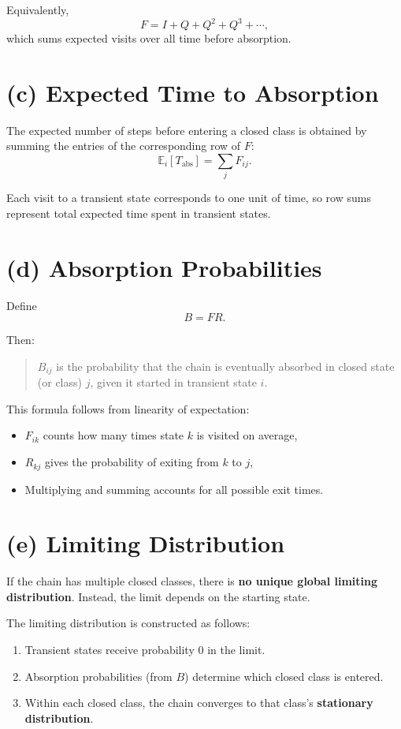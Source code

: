 \documentclass[11pt]{article}
\begin{document}
Equivalently,
\[
F = I + Q + Q^2 + Q^3 + \cdots,
\]
which sums expected visits over all time before absorption.

\section*{(c) Expected Time to Absorption}

The expected number of steps before entering a closed class is obtained by summing the entries of the corresponding row of $F$:
\[
\mathbb{E}_i[T_{\text{abs}}] = \sum_j F_{ij}.
\]

Each visit to a transient state corresponds to one unit of time, so row sums represent total expected time spent in transient states.

\section*{(d) Absorption Probabilities}

Define
\[
B = FR.
\]

Then:
\begin{quote}
$B_{ij}$ is the probability that the chain is eventually absorbed in closed state (or class) $j$, given it started in transient state $i$.
\end{quote}

This formula follows from linearity of expectation:
\begin{itemize}[leftmargin=2em]
    \item $F_{ik}$ counts how many times state $k$ is visited on average,
    \item $R_{kj}$ gives the probability of exiting from $k$ to $j$,
    \item Multiplying and summing accounts for all possible exit times.
\end{itemize}

\section*{(e) Limiting Distribution}

If the chain has multiple closed classes, there is \textbf{no unique global limiting distribution}.  
Instead, the limit depends on the starting state.

The limiting distribution is constructed as follows:
\begin{enumerate}[leftmargin=2em]
    \item Transient states receive probability $0$ in the limit.
    \item Absorption probabilities (from $B$) determine which closed class is entered.
    \item Within each closed class, the chain converges to that class’s \textbf{stationary distribution}.
\end{enumerate}
\end{document}

